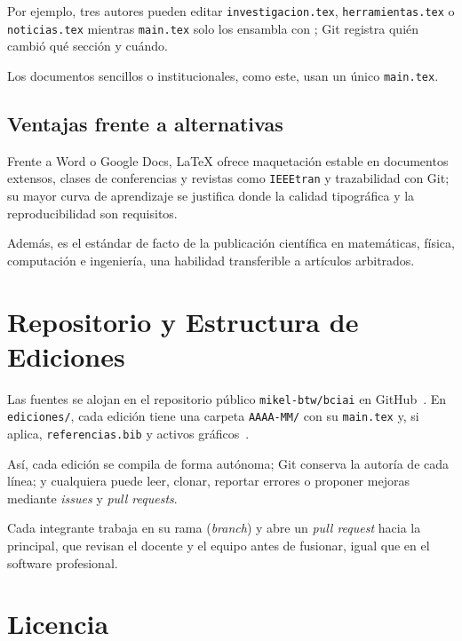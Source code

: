 \documentclass[conference,twocolumn,spanish]{IEEEtran}
\begin{document}
Por ejemplo, tres autores pueden editar \texttt{investigacion.tex},
\texttt{herramientas.tex} o \texttt{noticias.tex} mientras
\texttt{main.tex} solo los ensambla con \verb||; Git registra
quién cambió qué sección y cuándo.

Los documentos sencillos o institucionales, como este, usan un único
\texttt{main.tex}.

\subsection{Ventajas frente a alternativas}

Frente a Word o Google Docs, \LaTeX{} ofrece maquetación estable en
documentos extensos, clases de conferencias y revistas como
\texttt{IEEEtran} y trazabilidad con Git; su mayor curva de aprendizaje
se justifica donde la calidad tipográfica y la reproducibilidad son
requisitos.

Además, es el estándar de facto de la publicación científica en
matemáticas, física, computación e ingeniería, una habilidad
transferible a artículos arbitrados.

\section{Repositorio y Estructura de Ediciones}

Las fuentes se alojan en el repositorio público \texttt{mikel-btw/bciai}
en GitHub~\cite{repo}. En \texttt{ediciones/}, cada edición tiene una
carpeta \texttt{AAAA-MM/} con su \texttt{main.tex} y, si aplica,
\texttt{referencias.bib} y activos gráficos~\cite{ediciones}.

Así, cada edición se compila de forma autónoma; Git conserva la autoría
de cada línea; y cualquiera puede leer, clonar, reportar errores o
proponer mejoras mediante \textit{issues} y \textit{pull requests}.

Cada integrante trabaja en su rama (\textit{branch}) y abre un
\textit{pull request} hacia la principal, que revisan el docente y el
equipo antes de fusionar, igual que en el software profesional.

\section{Licencia}
\end{document}
